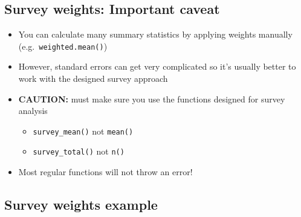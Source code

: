 \documentclass[
  letterpaper,
  DIV=11,
  numbers=noendperiod]{scrartcl}
\providecommand{\tightlist}{%
  \setlength{\itemsep}{0pt}\setlength{\parskip}{0pt}}
\begin{document}
\subsection{Survey weights: Important
caveat}\label{survey-weights-important-caveat}

\begin{itemize}
\tightlist
\item
  You can calculate many summary statistics by applying weights manually
  (e.g.~\texttt{weighted.mean()})
\item
  However, standard errors can get very complicated so it's usually
  better to work with the designed survey approach
\item
  \textbf{CAUTION:} must make sure you use the functions designed for
  survey analysis

  \begin{itemize}
  \tightlist
  \item
    \texttt{survey\_mean()} not \texttt{mean()}
  \item
    \texttt{survey\_total()} not \texttt{n()}
  \end{itemize}
\item
  Most regular functions will not throw an error!
\end{itemize}

\subsection{Survey weights example}\label{survey-weights-example}
\end{document}
